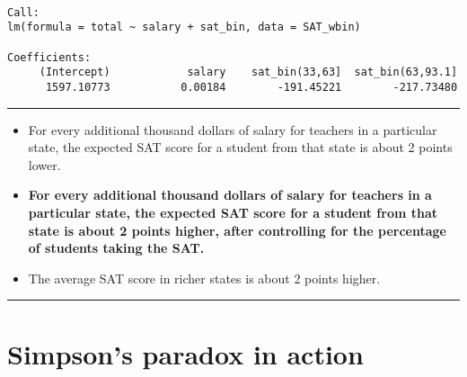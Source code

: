 \documentclass[]{book}
\newenvironment{Shaded}{\begin{snugshade}}{\end{snugshade}}
\newcommand{\KeywordTok}[1]{\textcolor[rgb]{0.13,0.29,0.53}{\textbf{#1}}}
\newcommand{\DataTypeTok}[1]{\textcolor[rgb]{0.13,0.29,0.53}{#1}}
\newcommand{\DecValTok}[1]{\textcolor[rgb]{0.00,0.00,0.81}{#1}}
\newcommand{\StringTok}[1]{\textcolor[rgb]{0.31,0.60,0.02}{#1}}
\newcommand{\OperatorTok}[1]{\textcolor[rgb]{0.81,0.36,0.00}{\textbf{#1}}}
\newcommand{\NormalTok}[1]{#1}
\begin{document}
\begin{Shaded}
\end{Shaded}

\begin{verbatim}

Call:
lm(formula = total ~ salary + sat_bin, data = SAT_wbin)

Coefficients:
     (Intercept)            salary    sat_bin(33,63]  sat_bin(63,93.1]  
      1597.10773           0.00184        -191.45221        -217.73480  
\end{verbatim}

\begin{center}\rule{0.5\linewidth}{\linethickness}\end{center}

\begin{itemize}
\item
  For every additional thousand dollars of salary for teachers in a
  particular state, the expected SAT score for a student from that state
  is about 2 points lower.
\item
  \textbf{For every additional thousand dollars of salary for teachers
  in a particular state, the expected SAT score for a student from that
  state is about 2 points higher, after controlling for the percentage
  of students taking the SAT.}
\item
  The average SAT score in richer states is about 2 points higher.
\end{itemize}

\begin{center}\rule{0.5\linewidth}{\linethickness}\end{center}

\section{Simpson's paradox in action}\label{simpsons-paradox-in-action}
\end{document}
